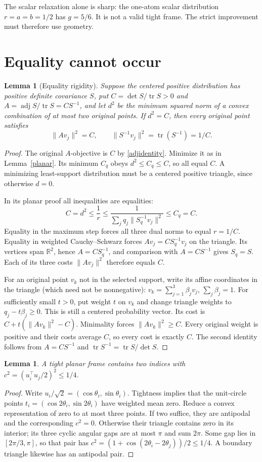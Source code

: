 \documentclass[10pt]{article}
\newtheorem{lemma}[theorem]{Lemma}
\newcommand{\R}{\mathbb R}
\newcommand{\tr}{\operatorname{tr}}
\newcommand{\adj}{\operatorname{adj}}
\begin{document}
The scalar relaxation alone is sharp: the one-atom scalar distribution
$r=a=b=1/2$ has $g=5/6$. It is not a valid tight frame.
The strict improvement must therefore use geometry.

\section{Equality cannot occur}
\begin{lemma}[Equality rigidity]\label{rigidity}
Suppose the centered positive distribution has positive definite covariance
$S$, put $C=\det S/\tr S>0$ and $A=\adj S/\tr S=CS^{-1}$, and let $d^2$
be the minimum squared norm of a convex combination of at most two original
points. If $d^2=C$, then every original point satisfies
\[
 \|Av_j\|^2=C,\qquad \|S^{-1}v_j\|^2=\tr(S^{-1})=1/C.
\]
\end{lemma}
\begin{proof}
The original $A$-objective is $C$ by \eqref{adjidentity}. Minimize it as in
Lemma~\ref{planar}. Its minimum $C_q$ obeys $d^2\le C_q\le C$, so all
equal $C$. A minimizing least-support distribution must be a centered
positive triangle, since otherwise $d=0$.

In its planar proof all inequalities are equalities:
\[
 C=d^2\le\frac1r\le
 \frac1{\sum_jq_j\|S_q^{-1}v_j\|^2}\le C_q=C.
\]
Equality in the maximum step forces all three dual norms to equal $r=1/C$.
Equality in weighted Cauchy--Schwarz forces
$Av_j=C S_q^{-1}v_j$ on the triangle. Its vertices span $\R^2$, hence
$A=C S_q^{-1}$, and comparison with $A=CS^{-1}$ gives $S_q=S$.
Each of its three costs $\|Av_j\|^2$ therefore equals $C$.

For an original point $v_k$ not in the selected support, write its affine
coordinates in the triangle (which need not be nonnegative):
$v_k=\sum_{j=1}^3\beta_jv_j$, $\sum_j\beta_j=1$. For sufficiently small
$t>0$, put weight $t$ on $v_k$ and change triangle weights to
$q_j-t\beta_j\ge0$. This is still a centered probability vector. Its cost
is $C+t(\|Av_k\|^2-C)$. Minimality forces $\|Av_k\|^2\ge C$.
Every original weight is positive and their costs average $C$, so every
cost is exactly $C$. The second identity follows from $A=CS^{-1}$ and
$\tr S^{-1}=\tr S/\det S$.
\end{proof}

\begin{lemma}\label{angles}
A tight planar frame contains two indices with
$c^2=(u_i^\top u_j/2)^2\le1/4$.
\end{lemma}
\begin{proof}
Write $u_i/\sqrt2=(\cos\theta_i,\sin\theta_i)$. Tightness implies that
the unit-circle points $t_i=(\cos2\theta_i,\sin2\theta_i)$ have weighted
mean zero. Reduce a convex representation of zero to at most three points.
If two suffice, they are antipodal and the corresponding $c^2=0$.
Otherwise their triangle contains zero in its interior; its three cyclic
angular gaps are at most $\pi$ and sum $2\pi$. Some gap lies in
$[2\pi/3,\pi]$, so that pair has
$c^2=(1+\cos(2\theta_i-2\theta_j))/2\le1/4$.
A boundary triangle likewise has an antipodal pair.
\end{proof}
\end{document}
